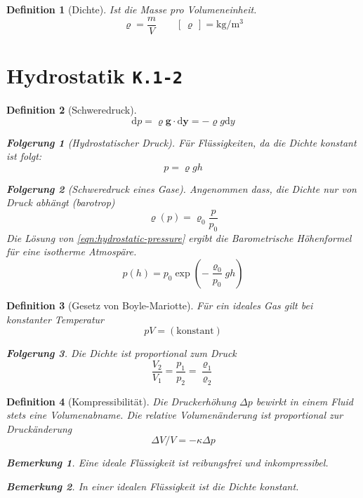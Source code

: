 \documentclass[a4paper, twocolumn]{article}
\numberwithin{equation}{section}
\theoremstyle{hsr-def}
\newtheorem{definition}{Definition}[section]
\theoremstyle{hsr-sub}
\newtheorem{result}{Folgerung}[definition]
\newtheorem{remark}{Bemerkung}[definition]
\newcommand{\dd}[1]{\ensuremath{\mathrm{d}#1}}
\renewcommand{\vec}[1]{\ensuremath{\mathbf{#1}}}
\newcommand{\unitsof}[1]{\ensuremath{\left[\,#1\,\right]}}
\newcommand{\fromlecture}[1]{\textcolor{red!70!black}{\small\texttt{K.#1}}}
\begin{document}
\begin{definition}[Dichte] Ist die Masse pro Volumeneinheit.
\[
    \varrho = \frac{m}{V} \qquad \unitsof{\varrho} = \si{\kilo\gram\per\cubic\metre}
\]
\end{definition}

\section{Hydrostatik \fromlecture{1-2}}

\begin{definition}[Schweredruck]
\begin{equation} \label{eqn:hydrostatic-pressure}
    \dd{p} = \varrho \vec{g} \cdot \dd{\vec{y}} = - \varrho g \dd{y}
\end{equation}

\begin{result}[Hydrostatischer Druck]
F\"ur Fl\"ussigkeiten, da die Dichte konstant ist folgt:
\[
    p = \varrho g h
\]
\end{result}

\begin{result}[Schweredruck eines Gase]
Angenommen dass, die Dichte nur von Druck abh\"angt (barotrop)
\[
    \varrho(p) = \varrho_0 \frac{p}{p_0}
\]
Die L\"osung von \eqref{eqn:hydrostatic-pressure} ergibt die \emph{Barometrische H\"ohenformel} f\"ur eine isotherme Atmosp\"are.
\[
    p(h) = p_0 \exp\left(-\frac{\varrho_0}{p_0} gh\right)
\]
\end{result}
\end{definition}

\begin{definition}[Gesetz von Boyle-Mariotte]
F\"ur ein ideales Gas gilt bei konstanter Temperatur
\[
    pV = (\text{konstant})
\]

\begin{result}
Die Dichte ist proportional zum Druck
\[
    \frac{V_2}{V_1} = \frac{p_1}{p_2} = \frac{\varrho_1}{\varrho_2}
\]
\end{result}
\end{definition}


\begin{definition}[Kompressibilit\"at]
Die Druckerh\"ohung \(\Delta p\) bewirkt in einem Fluid stets eine Volumenabname.
Die relative Volumen\"anderung ist proportional zur Druck\"anderung
\[
    \Delta V / V = - \kappa \Delta p
\]

\begin{remark}
    Eine ideale Fl\"ussigkeit ist reibungsfrei und inkompressibel.
\end{remark}

\begin{remark}
    In einer idealen Fl\"ussigkeit ist die Dichte konstant.
\end{remark}
\end{definition}
\end{document}
